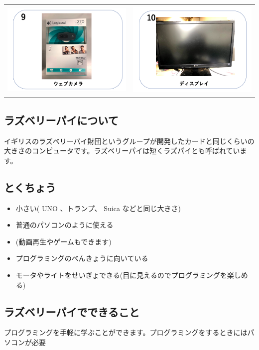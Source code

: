 \documentclass[a4paper,12pt]{jarticle}
\begin{document}
\begin{tabular}{cc}
\includegraphics[width=6.488cm,height=4.697cm]{textbook-img002.png}
	&
\includegraphics[width=6.488cm,height=4.697cm]{textbook-img001.png} \\
\end{tabular}

\subsection{ラズベリーパイについて}
イギリスのラズベリーパイ財団というグループが開発したカードと同じくらいの大きさのコンピュータです。ラズベリーパイは短くラズパイとも呼ばれています。

\subsection{とくちょう}
\begin{itemize}
\item 小さい( UNO 、トランプ、 Suica
などと同じ大きさ)
\item 普通のパソコンのように使える
\item (動画再生やゲームもできます)
\item
プログラミングのべんきょうに向いている
\item
モータやライトをせいぎょできる(目に見えるのでプログラミングを楽しめる)
\end{itemize}
\subsection{ラズベリーパイでできること}
プログラミングを手軽に学ぶことができます。プログラミングをするときにはパソコンが必要
\end{document}
